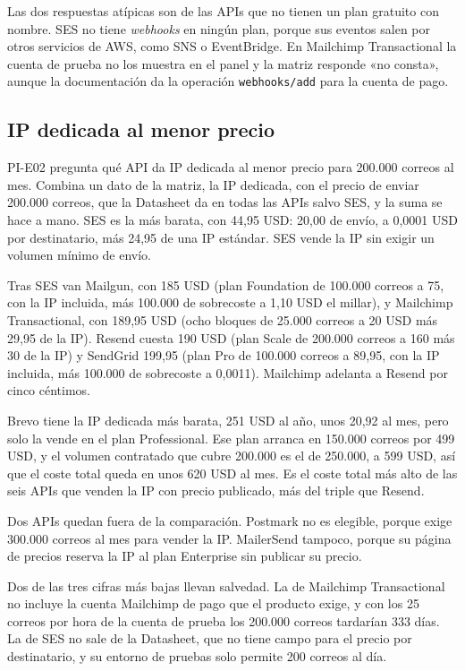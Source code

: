 Las dos respuestas atípicas son de las APIs que no tienen un plan gratuito con nombre.
SES no tiene \textit{webhooks} en ningún plan, porque sus eventos salen por otros servicios de AWS, como SNS o EventBridge.
En Mailchimp Transactional la cuenta de prueba no los muestra en el panel y la matriz responde «no consta», aunque la documentación da la operación \texttt{webhooks/add} para la cuenta de pago.

\subsection{IP dedicada al menor precio}

PI-E02 pregunta qué API da IP dedicada al menor precio para 200.000 correos al mes.
Combina un dato de la matriz, la IP dedicada, con el precio de enviar 200.000 correos, que la Datasheet da en todas las APIs salvo SES, y la suma se hace a mano.
SES es la más barata, con 44,95 USD: 20,00 de envío, a 0,0001 USD por destinatario, más 24,95 de una IP estándar.
SES vende la IP sin exigir un volumen mínimo de envío.

Tras SES van Mailgun, con 185 USD (plan Foundation de 100.000 correos a 75, con la IP incluida, más 100.000 de sobrecoste a 1,10 USD el millar), y Mailchimp Transactional, con 189,95 USD (ocho bloques de 25.000 correos a 20 USD más 29,95 de la IP).
Resend cuesta 190 USD (plan Scale de 200.000 correos a 160 más 30 de la IP) y SendGrid 199,95 (plan Pro de 100.000 correos a 89,95, con la IP incluida, más 100.000 de sobrecoste a 0,0011).
Mailchimp adelanta a Resend por cinco céntimos.

Brevo tiene la IP dedicada más barata, 251 USD al año, unos 20,92 al mes, pero solo la vende en el plan Professional.
Ese plan arranca en 150.000 correos por 499 USD, y el volumen contratado que cubre 200.000 es el de 250.000, a 599 USD, así que el coste total queda en unos 620 USD al mes.
Es el coste total más alto de las seis APIs que venden la IP con precio publicado, más del triple que Resend.

Dos APIs quedan fuera de la comparación.
Postmark no es elegible, porque exige 300.000 correos al mes para vender la IP.
MailerSend tampoco, porque su página de precios reserva la IP al plan Enterprise sin publicar su precio.

Dos de las tres cifras más bajas llevan salvedad.
La de Mailchimp Transactional no incluye la cuenta Mailchimp de pago que el producto exige, y con los 25 correos por hora de la cuenta de prueba los 200.000 correos tardarían 333 días.
La de SES no sale de la Datasheet, que no tiene campo para el precio por destinatario, y su entorno de pruebas solo permite 200 correos al día.

